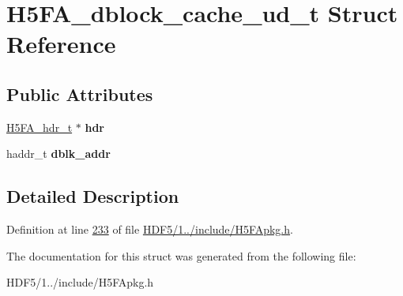 \hypertarget{struct_h5_f_a__dblock__cache__ud__t}{}\section{H5\+F\+A\+\_\+dblock\+\_\+cache\+\_\+ud\+\_\+t Struct Reference}
\label{struct_h5_f_a__dblock__cache__ud__t}
\subsection*{Public Attributes}
\begin{DoxyCompactItemize}
\item 
\mbox{\label{struct_h5_f_a__dblock__cache__ud__t_a0dd9ce1b04d8bc18751caee27dea2969}} 
\hyperlink{struct_h5_f_a__hdr__t}{H5\+F\+A\+\_\+hdr\+\_\+t} $\ast$ {\bfseries hdr}
\item 
\mbox{\label{struct_h5_f_a__dblock__cache__ud__t_a9ef7a71bc811b5de9f7da2215d1fed4a}} 
haddr\+\_\+t {\bfseries dblk\+\_\+addr}
\end{DoxyCompactItemize}


\subsection{Detailed Description}


Definition at line \hyperlink{_h_d_f5_21_810_81_2include_2_h5_f_apkg_8h_source_l00233}{233} of file \hyperlink{_h_d_f5_21_810_81_2include_2_h5_f_apkg_8h_source}{H\+D\+F5/1../include/\+H5\+F\+Apkg.\+h}.



The documentation for this struct was generated from the following file\+:\begin{DoxyCompactItemize}
\item 
H\+D\+F5/1../include/\+H5\+F\+Apkg.\+h\end{DoxyCompactItemize}

